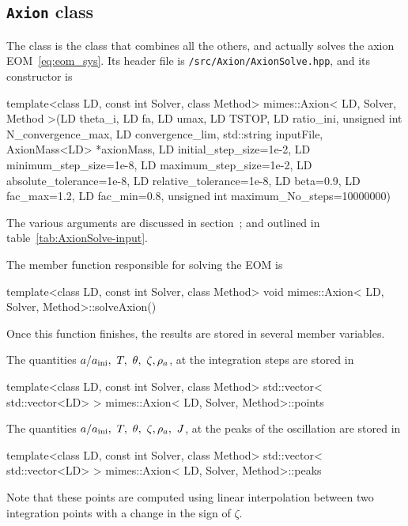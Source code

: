 \documentclass[11pt,a4paper]{article}
\begin{document}
\subsection{{\tt Axion} class}
%
The  class is the class that combines all the others, and actually solves the axion EOM~\ref{eq:eom_sys}. Its header file is {\tt \mimes/src/Axion/AxionSolve.hpp}, and its constructor is
%
\begin{cpp}
 	template<class LD, const int Solver, class Method>
	mimes::Axion< LD, Solver, Method >(LD theta_i, LD fa, LD umax, LD TSTOP, 
			LD ratio_ini, unsigned int N_convergence_max, LD convergence_lim, 
			std::string inputFile, AxionMass<LD> *axionMass, LD initial_step_size=1e-2, 
			LD minimum_step_size=1e-8, LD maximum_step_size=1e-2, LD absolute_tolerance=1e-8, 
			LD relative_tolerance=1e-8, LD beta=0.9, LD fac_max=1.2, LD fac_min=0.8, 
			unsigned int maximum_No_steps=10000000)
\end{cpp}
%
The various arguments are discussed in section~; and outlined in table~\ref{tab:AxionSolve-input}.
%

The member function responsible for solving the EOM is
%
\begin{cpp}
	template<class LD, const int Solver, class Method>
	void mimes::Axion< LD, Solver, Method>::solveAxion()
\end{cpp}
%
Once this function finishes, the results are stored in several member variables.

The quantities $a/\ai, \ T, \ \theta, \ \zeta, \rho_a$, at the integration  steps are stored in
%
\begin{cpp}
	template<class LD, const int Solver, class Method> 
	std::vector< std::vector<LD> > mimes::Axion< LD, Solver, Method>::points
\end{cpp}
%

The quantities $a/\ai, \ T, \ \theta, \ \zeta, \rho_a, \ J$, at the peaks of the oscillation are stored in 
%
\begin{cpp}
	template<class LD, const int Solver, class Method> 
	std::vector< std::vector<LD> > mimes::Axion< LD, Solver, Method>::peaks
\end{cpp}
%
Note that these points are computed using linear interpolation between two integration points with a change in the sign of $\zeta$.
\end{document}
